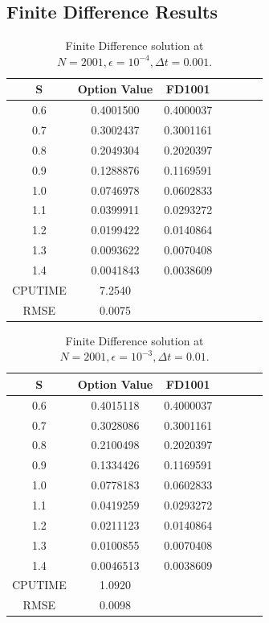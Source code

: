 \documentclass[12pt]{article}
\numberwithin{equation}{section} %
\begin{document}
\subsection{Finite Difference Results}
\begin{table}[h]
\centering
\begin{tabular}{|c|c|c|c|c|c|c|}
  \hline
  S & Option Value & FD1001\\
  \hline

  0.6 & 0.4001500&0.4000037  \\
  0.7 &0.3002437 &0.3001161 \\
  0.8 &0.2049304&0.2020397 \\
  0.9 &0.1288876&0.1169591 \\
  1.0 &0.0746978 &0.0602833 \\
  1.1 &0.0399911&0.0293272  \\
  1.2 &0.0199422&0.0140864   \\
  1.3 & 0.0093622&0.0070408  \\
  1.4& 0.0041843&0.0038609\\
  \hline
CPUTIME&7.2540& \\
\hline
 RMSE&0.0075&\\
  \hline


\end{tabular}
  \caption{Finite Difference solution at $N=2001,\epsilon=10^{-4},\Delta t=0.001$.}\label{Tab_1}
\end{table}




\begin{table}[h]
\centering
\begin{tabular}{|c|c|c|c|c|c|c|}
  \hline
  S & Option Value & FD1001 \\
  \hline

  0.6 & 0.4015118&0.4000037  \\
  0.7 &0.3028086&0.3001161 \\
  0.8 & 0.2100498&0.2020397\\
  0.9 & 0.1334426&0.1169591\\
  1.0 &  0.0778183&0.0602833\\
  1.1 & 0.0419259&0.0293272\\
  1.2 &  0.0211123&0.0140864\\
  1.3 & 0.0100855&0.0070408  \\
  1.4&0.0046513&0.0038609 \\
 \hline
CPUTIME&1.0920&\\
\hline
 RMSE&0.0098& \\
  \hline
\end{tabular}
  \caption{Finite Difference solution at $N=2001,\epsilon=10^{-3},\Delta t=0.01$.}\label{Tab_}
\end{table}
\end{document}
